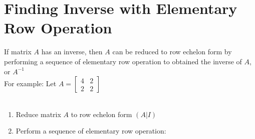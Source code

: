 \documentclass[a4paper,12pt]{article}
\begin{document}
\section*{Finding Inverse with Elementary Row Operation}
If matrix \(A\) has an inverse, then \(A\) can be reduced to row echelon form by performing a sequence of elementary row operation to obtained the inverse of \(A\), or \(A^{-1}\) \\
For example: Let \(A=\begin{bmatrix}
  4 & 2 \\ 2 & 2
\end{bmatrix}\) \\ \\
\begin{enumerate}
  \item Reduce matrix \(A\) to row echelon form \((A | I)\)
  \item Perform a sequence of elementary row operation:
        \begin{enumerate}
          \item \(\left[\begin{array}{cc|cc}
                    4 & 2 & 1 & 0 \\ 2 & 2 & 0 & 1
                  \end{array}\right] \) $\xRightarrow{R_1 \leftarrow \frac{1}{4}R_1}$\(\left[\begin{array}{cc|cc}
                    1 & \frac{1}{2} & \frac{1}{4} & 0 \\ 2 & 2 & 0 & 1
                  \end{array}\right] \)
          \item \(\left[\begin{array}{cc|cc}
                    1 & \frac{1}{2} & \frac{1}{4} & 0 \\ 2 & 2 & 0 & 1
                  \end{array}\right] \) $\xRightarrow{R_2 \leftarrow R_2 - 2R_1}$ \(\left[\begin{array}{cc|cc}
                    1 & \frac{1}{2} & \frac{1}{4} & 0 \\ 0 & 1 & -\frac{1}{2} & 1
                  \end{array}\right] \)
          \item \(\left[\begin{array}{cc|cc}
                    1 & \frac{1}{2} & \frac{1}{4} & 0 \\ 0 & 1 & -\frac{1}{2} & 1
                  \end{array}\right] \) $\xRightarrow{R_1 \leftarrow R_1-\frac{1}{2}R_2}$ \(\left[\begin{array}{cc|cc}

\end{array}
\end{enumerate}
\end{enumerate}
\end{document}
